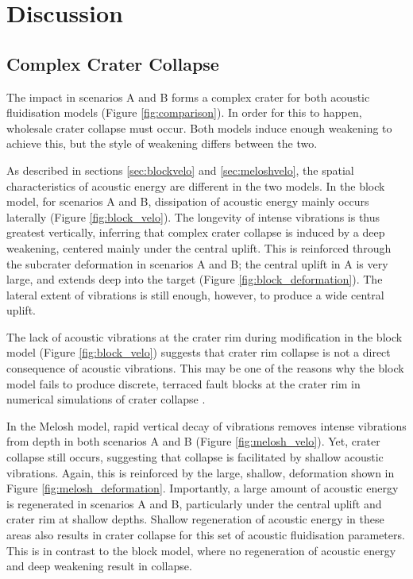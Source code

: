 \section{Discussion \label{sec:discussion}}

\subsection{Complex Crater Collapse} 

The impact in scenarios A and B forms a complex crater for both acoustic fluidisation models (Figure \ref{fig:comparison}). In order for this to happen, wholesale crater collapse must occur. Both models induce enough weakening to achieve this, but the style of weakening differs between the two.

As described in sections \ref{sec:blockvelo} and \ref{sec:meloshvelo}, the spatial characteristics of acoustic energy are different in the two models. In the block model, for scenarios A and B, dissipation of acoustic energy mainly occurs laterally (Figure \ref{fig:block_velo}). The longevity of intense vibrations is thus greatest vertically, inferring that complex crater collapse is induced by a deep weakening, centered mainly under the central uplift. This is reinforced through the subcrater deformation in scenarios A and B; the central uplift in A is very large, and extends deep into the target (Figure \ref{fig:block_deformation}). The lateral extent of vibrations is still enough, however, to produce a wide central uplift. 

The lack of acoustic vibrations at the crater rim during modification in the block model (Figure \ref{fig:block_velo}) suggests that crater rim collapse is not a direct consequence of acoustic vibrations. This may be one of the reasons why the block model fails to produce discrete, terraced fault blocks at the crater rim in numerical simulations of crater collapse \citep{kenkmann2012modification}.

In the Melosh model, rapid vertical decay of vibrations removes intense vibrations from depth  in both scenarios A and B (Figure \ref{fig:melosh_velo}). Yet, crater collapse still occurs, suggesting that collapse is facilitated by shallow acoustic vibrations. Again, this is reinforced by the large, shallow, deformation shown in Figure \ref{fig:melosh_deformation}. Importantly, a large amount of acoustic energy is regenerated in scenarios A and B, particularly under the central uplift and crater rim at shallow depths. Shallow regeneration of acoustic energy in these areas also results in crater collapse for this set of acoustic fluidisation parameters. This is in contrast to the block model, where no regeneration of acoustic energy and deep weakening result in collapse.


